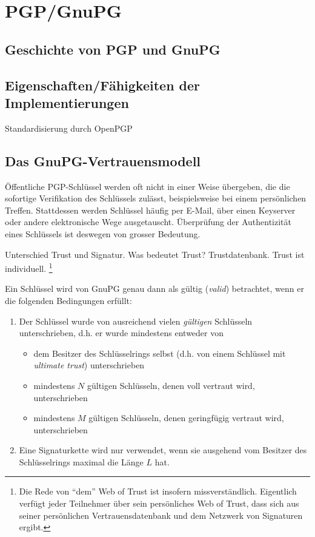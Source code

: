 \section{PGP/GnuPG}
\label{ch:Grundlagen:sec:PGP}

\cite{wiki:pgp}

\subsection{Geschichte von PGP und GnuPG}
\label{ch:Grundlagen:sec:PGP:subsec:Geschichte}

\subsection{Eigenschaften/Fähigkeiten der Implementierungen}
\label{ch:Grundlagen:sec:PGP:subsec:Eigenschaften}

Standardisierung durch OpenPGP \cite{Callas1998} \cite{Callas2007}


\subsection{Das GnuPG-Vertrauensmodell}
\label{sec:das-gnupg-vertrauensmodell}

Öffentliche PGP-Schlüssel werden oft nicht in einer Weise übergeben,
die die sofortige Verifikation des Schlüssels zulässt, beispielsweise
bei einem persönlichen Treffen. Stattdessen werden Schlüssel häufig
per E-Mail, über einen Keyserver oder andere elektronische Wege
ausgetauscht.  Überprüfung der Authentizität eines Schlüssels ist
deswegen von grosser Bedeutung.

Unterschied Trust und Signatur. Was bedeutet Trust?
Trustdatenbank. Trust ist individuell. \footnote{Die Rede von ``dem''
  Web of Trust ist insofern missverst\"andlich. Eigentlich verf\"ugt
  jeder Teilnehmer \"uber sein pers\"onliches Web of Trust, dass sich
  aus seiner pers\"onlichen Vertrauensdatenbank und dem Netzwerk von
  Signaturen ergibt.}

Ein Schlüssel wird von GnuPG genau dann als gültig (\emph{valid})
betrachtet, wenn er die folgenden Bedingungen erfüllt:

\begin{enumerate}
\item Der Schlüssel wurde von ausreichend vielen \emph{gültigen} Schlüsseln
  unterschrieben, d.h. er wurde mindestens entweder von
  \begin{itemize}
  \item dem Besitzer des Schlüsselrings selbst (d.h. von einem
    Schlüssel mit \emph{ultimate trust}) unterschrieben
  \item mindestens $N$ gültigen Schlüsseln, denen voll vertraut wird, unterschrieben
  \item mindestens $M$ gültigen Schlüsseln, denen geringfügig
    vertraut wird, unterschrieben
  \end{itemize}
\item Eine Signaturkette wird nur verwendet, wenn sie ausgehend vom
  Besitzer des Schlüsselrings maximal die Länge $L$ hat.
\end{enumerate}

